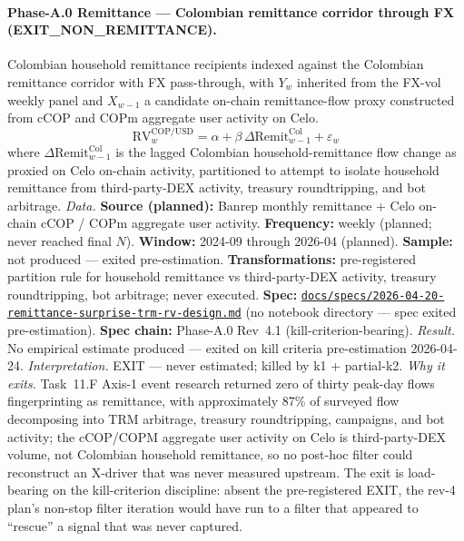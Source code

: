 \paragraph{Phase-A.0 Remittance --- Colombian remittance corridor through FX (EXIT\_NON\_REMITTANCE).}
Colombian household remittance recipients indexed against the Colombian remittance corridor with FX pass-through, with \(Y_w\) inherited from the FX-vol weekly panel and \(X_{w-1}\) a candidate on-chain remittance-flow proxy constructed from cCOP and COPm aggregate user activity on Celo.
\[ \mathrm{RV}^{\mathrm{COP/USD}}_w = \alpha + \beta\, \Delta \mathrm{Remit}^{\mathrm{Col}}_{w-1} + \varepsilon_w \]
where \(\Delta \mathrm{Remit}^{\mathrm{Col}}_{w-1}\) is the lagged Colombian household-remittance flow change as proxied on Celo on-chain activity, partitioned to attempt to isolate household remittance from third-party-DEX activity, treasury roundtripping, and bot arbitrage.
\textit{Data.} \textbf{Source (planned):} Banrep monthly remittance + Celo on-chain cCOP / COPm aggregate user activity. \textbf{Frequency:} weekly (planned; never reached final \(N\)). \textbf{Window:} 2024-09 through 2026-04 (planned). \textbf{Sample:} not produced --- exited pre-estimation. \textbf{Transformations:} pre-registered partition rule for household remittance vs third-party-DEX activity, treasury roundtripping, bot arbitrage; never executed. \textbf{Spec:} \href{https://github.com/JMSBPP/abrigo-analytics/blob/master/docs/specs/2026-04-20-remittance-surprise-trm-rv-design.md}{\texttt{docs/specs/2026-04-20-remittance-surprise-trm-rv-design.md}} (no notebook directory --- spec exited pre-estimation). \textbf{Spec chain:} Phase-A.0 Rev~4.1 (kill-criterion-bearing).
\textit{Result.} No empirical estimate produced --- exited on kill criteria pre-estimation 2026-04-24.
\textit{Interpretation.} EXIT --- never estimated; killed by k1 + partial-k2.
\textit{Why it exits.} Task~11.F Axis-1 event research returned zero of thirty peak-day flows fingerprinting as remittance, with approximately 87\% of surveyed flow decomposing into TRM arbitrage, treasury roundtripping, campaigns, and bot activity; the cCOP/COPM aggregate user activity on Celo is third-party-DEX volume, not Colombian household remittance, so no post-hoc filter could reconstruct an X-driver that was never measured upstream. The exit is load-bearing on the kill-criterion discipline: absent the pre-registered EXIT, the rev-4 plan's non-stop filter iteration would have run to a filter that appeared to ``rescue'' a signal that was never captured.

